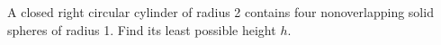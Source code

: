 A closed right circular cylinder of radius 2 contains four nonoverlapping solid spheres of radius 1. Find its least possible height $h$.

